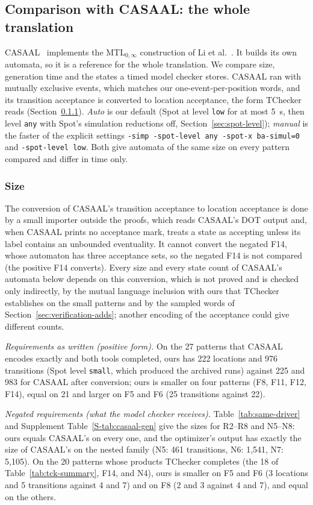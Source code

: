 \subsection{Comparison with CASAAL: the whole translation}
\label{sec:casaal-eval}
CASAAL~\cite{casaal_tool} implements the MTL$_{0,\infty}$ construction of Li et al.~\cite{li_spin7}. It builds its own automata, so it is a reference for the whole translation. We compare size, generation time and the states a timed model checker stores. CASAAL ran with mutually exclusive events, which matches our one-event-per-position words, and its transition acceptance is converted to location acceptance, the form TChecker reads (Section~\ref{sec:casaal-size}). \emph{Auto} is our default (Spot at level \texttt{low} for at most 5~s, then level \texttt{any} with Spot's simulation reductions off, Section~\ref{sec:spot-level}); \emph{manual} is the faster of the explicit settings \texttt{-simp -spot-level any -spot-x ba-simul=0} and \texttt{-spot-level low}. Both give automata of the same size on every pattern compared and differ in time only.

\subsubsection{Size}
\label{sec:casaal-size}
The conversion of CASAAL's transition acceptance to location acceptance is done
by a small importer outside the proofs, which reads CASAAL's DOT output and, when
CASAAL prints no acceptance mark, treats a state as accepting unless its label
contains an unbounded eventuality. It cannot convert the negated F14, whose automaton has three
acceptance sets, so the negated F14 is not compared (the positive F14 converts). Every size and every state count of CASAAL's automata below depends on this conversion, which is not proved and is checked only indirectly, by the mutual language inclusion with ours that TChecker establishes on the small patterns and by the sampled words of Section~\ref{sec:verification-adds}; another encoding of the acceptance could give different counts.

\emph{Requirements as written (positive form).} On the 27 patterns that CASAAL encodes exactly and both tools completed, ours has 222 locations and 976 transitions (Spot level \texttt{small}, which produced the archived runs) against 225 and 983 for CASAAL after conversion; ours is smaller on four patterns (F8, F11, F12, F14), equal on 21 and larger on F5 and F6 (25 transitions against 22).

\emph{Negated requirements (what the model checker receives).} Table~\ref{tab:same-driver} and Supplement Table~\ref{S-tab:casaal-gen} give the sizes for R2--R8 and N5--N8: ours equals CASAAL's on every one, and the optimizer's output has exactly the size of CASAAL's on the nested family (N5: 461 transitions, N6: 1,541, N7: 5,105). On the 20 patterns whose products TChecker completes (the 18 of Table~\ref{tab:tck-summary}, F14, and N4), ours is smaller on F5 and F6 (3 locations and 5 transitions against 4 and 7) and on F8 (2 and 3 against 4 and 7), and equal on the others.


